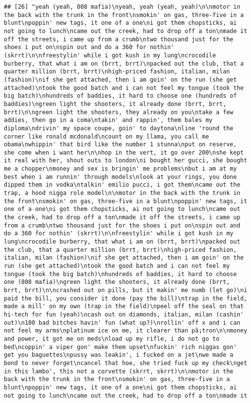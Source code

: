 \documentclass[]{article}
\begin{document}
\begin{verbatim}
## [26] "yeah (yeah, 808 mafia)\nyeah, yeah (yeah, yeah)\n\nmotor in the back with the trunk in the front\nsmokin' on gas, three-five in a blunt\npoppin' new tags, it one of a one\ni got them chopsticks, ai not going to lunch\ncame out the creek, had to drop off a ton\nmade it off the streets, i came up from a crumb\ntwo thousand just for the shoes i put on\nspin out and do a 360 for nothin' (skrrt)\n\nfreestylin' while i got kush in my lung\ncrocodile burberry, that what i am on (brrt, brrt)\npacked out the club, that a quarter million (brrt, brrt)\nhigh-priced fashion, italian, milan (fashion)\nif she get attached, then i am goin' on the run (she get attached)\ntook the good batch and i can not feel my tongue (took the big batch)\nhundreds of baddies, it hard to choose one (hundreds of baddies)\ngreen light the shooters, it already done (brrt, brrt, brrt)\n\ngreen light the shooters, they already on you\ntake a few addies, then go in a coma\ntakin' and rappin', them bales my diploma\ndrivin' my space coupe, goin' to daytona\nline 'round the corner like ronald mcdonald\ncount on my llama, you call me obama\nwhippin' that bird like the number 1 stunna\nput on reserve, she come when i want her\n\nhop in the vert, it go over 200\nshe kept it real with her, shout outs to london\ni bought her gucci, she bought me a chopper\nmoney and sex is bringin' me problems\nbut i am at my best when i am runnin' through models\nlook at your rings, you done dipped them in vodka\ntalkin' emilio pucci, i got them\ncame out the trap, a hood nigga role model\n\nmotor in the back with the trunk in the front\nsmokin' on gas, three-five in a blunt\npoppin' new tags, it one of a one\ni got them chopsticks, ai not going to lunch\ncame out the creek, had to drop off a ton\nmade it off the streets, i came up from a crumb\ntwo thousand just for the shoes i put on\nspin out and do a 360 for nothin' (skrrt)\n\nfreestylin' while i got kush in my lung\ncrocodile burberry, that what i am on (brrt, brrt)\npacked out the club, that a quarter million (brrt, brrt)\nhigh-priced fashion, italian, milan (fashion)\nif she get attached, then i am goin' on the run (she get attached)\ntook the good batch and i can not feel my tongue (took the big batch)\nhundreds of baddies, it hard to choose one (808 mafia)\ngreen light the shooters, it already done (brrt, brrt, brrt)\n\ncrashed out on pills, but it makin' me numb (let go)\ni paid the bill, you consider it done (pay the bill)\ntrap in the field, made a mill' on my own (trap in the field)\npeel off the seal on that hi-tech for fun (yeah)\ncash out on diamonds, italian, milan (cashin' out)\n100 bad bitches havin' fun (what up?)\nrollin' off x and i can not feel my arms\nplatinum ice on me, it clearer than pã¡tron\n\nmoney and power, it got me on meds\nload up my rifle, i do not go to bed\ncoppin' a viper gon' make them upset\nfuckin' rich niggas gon' get you baguettes\npussy was leakin', i fucked on a jet\nwe made a bond to never forget\ncancel that hoe, she tried fuck up my check\nget in this lambo', this not a corvette (skrrt, skrrt)\n\nmotor in the back with the trunk in the front\nsmokin' on gas, three-five in a blunt\npoppin' new tags, it one of a one\ni got them chopsticks, ai not going to lunch\ncame out the creek, had to drop off a ton\nmade it 
\end{verbatim}
\end{document}
